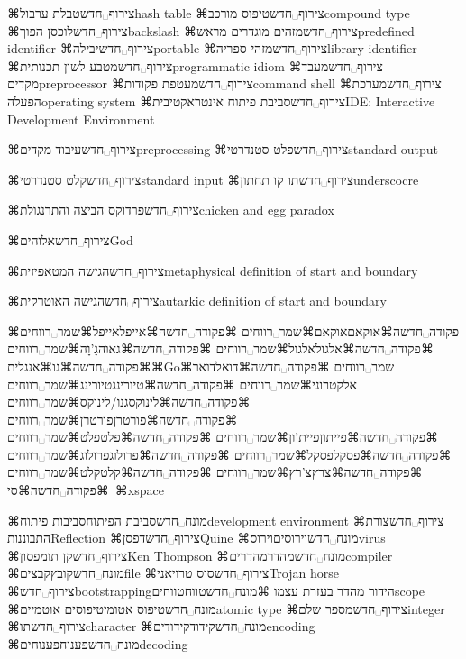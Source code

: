 ⌘צירוף␣חדש{טבלת ערבול}{hash table}
⌘צירוף␣חדש{טיפוס מורכב}{compound type}
⌘צירוף␣חדש{לוכסן הפוך}{backslash}
⌘צירוף␣חדש{מזהים מוגדרים מראש}{predefined identifier}
⌘צירוף␣חדש{יבילה}{portable}
⌘צירוף␣חדש{מזהי ספריה}{library identifier}
⌘צירוף␣חדש{מטבע לשון תכנותית}{programmatic idiom}
⌘צירוף␣חדש{מעבד מקדים}{preprocessor}
⌘צירוף␣חדש{מעטפת פקודות}{command shell}
⌘צירוף␣חדש{מערכת הפעלה}{operating system}
⌘צירוף␣חדש{סביבת פיתוח אינטראקטיבית}{IDE: Interactive Development Environment}


⌘צירוף␣חדש{עיבוד מקדים}{preprocessing}
⌘צירוף␣חדש{פלט סטנדרטי}{standard output}

⌘צירוף␣חדש{קלט סטנדרטי}{standard input}
⌘צירוף␣חדש{תו קו תחתון}{underscocre}

⌘צירוף␣חדש{פרדוקס הביצה והתרנגולת}{chicken and egg paradox}


⌘צירוף␣חדש{אלוהים}{God}


⌘צירוף␣חדש{הגישה המטאפיזית}{metaphysical definition of start and boundary}


⌘צירוף␣חדש{הגישה האוטרקית}{autarkic definition of start and boundary}



⌘פקודה␣חדשה⌘אוקאם{אוקאם⌘שמר␣רווחים}
⌘פקודה␣חדשה⌘אייפל{אייפל⌘שמר␣רווחים}
⌘פקודה␣חדשה⌘אלגול{אלגול⌘שמר␣רווחים}
⌘פקודה␣חדשה⌘גאוה{גָ'וָה⌘שמר␣רווחים}
⌘פקודה␣חדשה⌘גו{⌘אנגלית{⌘Go}⌘שמר␣רווחים}
⌘פקודה␣חדשה⌘דואל{דואר אלקטרוני⌘שמר␣רווחים}
⌘פקודה␣חדשה⌘טיורינג{טיורינג⌘שמר␣רווחים}
⌘פקודה␣חדשה⌘לינוקס{גנו/לינוקס⌘שמר␣רווחים}
⌘פקודה␣חדשה⌘פורטרן{פורטרן⌘שמר␣רווחים}
⌘פקודה␣חדשה⌘פייתון{פיית'ון⌘שמר␣רווחים}
⌘פקודה␣חדשה⌘פלט{פלט⌘שמר␣רווחים}
⌘פקודה␣חדשה⌘פסקל{פסקל⌘שמר␣רווחים}
⌘פקודה␣חדשה⌘פרולוג{פרולוג⌘שמר␣רווחים}
⌘פקודה␣חדשה⌘צרץ{צ'רץ⌘שמר␣רווחים}
⌘פקודה␣חדשה⌘קלט{קלט⌘שמר␣רווחים}
⌘פקודה␣חדשה⌘סי{\unskip~⌘xspace}

⌘מונח␣חדש{סביבת הפיתוח}{סביבות פיתוח}{development environment}
⌘צירוף␣חדש{צורת התבוננות}{Reflection}
⌘צירוף␣חדש{דפסן}{Quine}
⌘מונח␣חדש{וירוסים}{וירוס}{virus}
⌘צירוף␣חדש{קן תומפסון}{Ken Thompson}
⌘מונח␣חדש{מהדר}{מהדרים}{compiler}
⌘מונח␣חדש{קובץ}{קבצים}{file}
⌘צירוף␣חדש{סוס טרויאני}{Trojan horse}
⌘צירוף␣חדש{bootstrapping}{הידור מהדר בעזרת עצמו}
⌘מונח␣חדש{טווח}{טווחים}{scope}
⌘מונח␣חדש{טיפוס אטומי}{טיפוסים אוטמיים}{atomic type}
⌘צירוף␣חדש{מספר שלם}{integer}
⌘צירוף␣חדש{תו}{character}
⌘מונח␣חדש{קידוד}{קידודים}{encoding}
⌘מונח␣חדש{פענוח}{פענוחים}{decoding}
